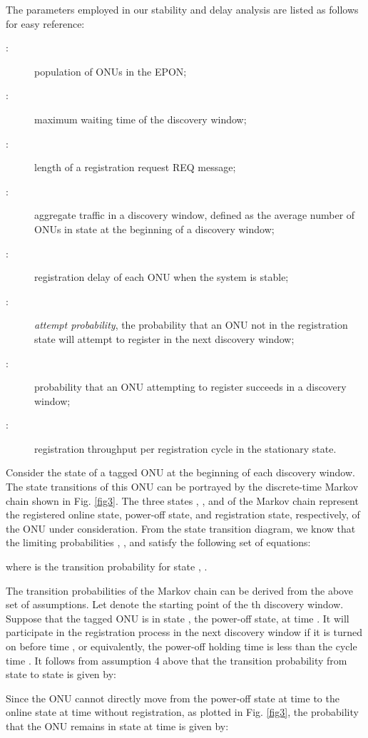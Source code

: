 \documentclass[journal]{IEEEtran}
\begin{document}
The parameters employed in our stability and delay analysis are listed as follows for easy reference:
\begin{description}
  \item [:] population of ONUs in the EPON;
  \item [:] maximum waiting time of the discovery window;
  \item [:] length of a registration request REQ message;
  \item [:] aggregate traffic in a discovery window, defined as the average number of ONUs in state  at the beginning of a discovery window;
  \item [:] registration delay of each ONU when the system is stable;
  \item [:] \emph{attempt probability}, the probability that an ONU not in the registration state will attempt to register in the next discovery window;
  \item [:] probability that an ONU attempting to register succeeds in a discovery window;
  \item [:] registration throughput per registration cycle in the stationary state.
\end{description}


Consider the state of a tagged ONU at the beginning of each discovery window. The state transitions of this ONU can be portrayed by the discrete-time Markov chain shown in Fig. \ref{fig3}. The three states , , and  of the Markov chain represent the registered online state, power-off state, and registration state, respectively, of the ONU under consideration. From the state transition diagram, we know that the limiting probabilities , , and  satisfy the following set of equations:

where  is the transition probability for state , .

The transition probabilities of the Markov chain can be derived from the above set of assumptions.  Let  denote the starting point of the th discovery window. Suppose that the tagged ONU is in state , the power-off state, at time . It will participate in the registration process in the next discovery window if it is turned on before time , or equivalently, the power-off holding time  is less than the cycle time . It follows from assumption 4 above that the transition probability from state  to state  is given by:

Since the ONU cannot directly move from the power-off state  at time  to the online state  at time  without registration, as plotted in Fig. \ref{fig3}, the probability that the ONU remains in state  at time  is given by:
\end{document}
